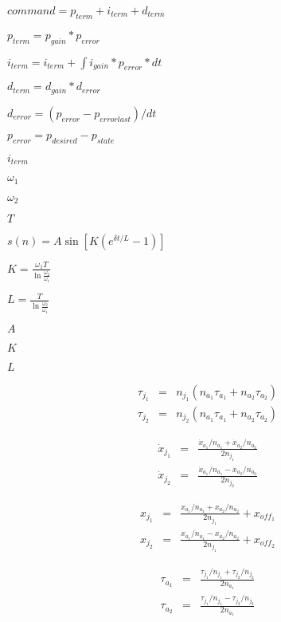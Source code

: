 \documentclass{article}
\begin{document}
$command = p_{term} + i_{term} + d_{term} $
\pagebreak

$ p_{term} = p_{gain} * p_{error} $
\pagebreak

$ i_{term} = i_{term} + \int{i_{gain} * p_{error} * dt} $
\pagebreak

$ d_{term} = d_{gain} * d_{error} $
\pagebreak

$ d_{error} = (p_{error} - p_{error last}) / dt $
\pagebreak

$ p_{error} = p_{desired} - p_{state} $
\pagebreak

$i_{term}$
\pagebreak

$\omega_1$
\pagebreak

$\omega_2$
\pagebreak

$T$
\pagebreak

$s(n) = A \sin [ K(e^{\delta t/L} - 1) ]$
\pagebreak

$K = \frac{\omega_1T}{\ln \frac{\omega_2}{\omega_1} }$
\pagebreak

$L = \frac{T}{\ln \frac{\omega_2}{\omega_1} }$
\pagebreak

$A$
\pagebreak

$K$
\pagebreak

$L$
\pagebreak

\begin{eqnarray*} \tau_{j_1} & = & n_{j_1} ( n_{a_1} \tau_{a_1} + n_{a_2} \tau_{a_2} ) \\[2.5em] \tau_{j_2} & = & n_{j_2} ( n_{a_1} \tau_{a_1} + n_{a_2} \tau_{a_2} ) \end{eqnarray*}
\pagebreak

\begin{eqnarray*} \dot{x}_{j_1} & = & \frac{ \dot{x}_{a_1} / n_{a_1} + \dot{x}_{a_2} / n_{a_2} }{2 n_{j_1}} \\[1em] \dot{x}_{j_2} & = & \frac{ \dot{x}_{a_1} / n_{a_1} - \dot{x}_{a_2} / n_{a_2} }{2 n_{j_2}} \end{eqnarray*}
\pagebreak

\begin{eqnarray*} x_{j_1} & = & \frac{ x_{a_1} / n_{a_1} + x_{a_2} / n_{a_2} }{2 n_{j_1}} + x_{off_1} \\[1em] x_{j_2} & = & \frac{ x_{a_1} / n_{a_1} - x_{a_2} / n_{a_2} }{2 n_{j_1}} + x_{off_2} \end{eqnarray*}
\pagebreak

\begin{eqnarray*} \tau_{a_1} & = & \frac{ \tau_{j_1} / n_{j_1} + \tau_{j_2} / n_{j_2} }{2 n_{a_1}} \\[1em] \tau_{a_2} & = & \frac{ \tau_{j_1} / n_{j_1} - \tau_{j_2} / n_{j_2} }{2 n_{a_1}} \end{eqnarray*}
\pagebreak
\end{document}

